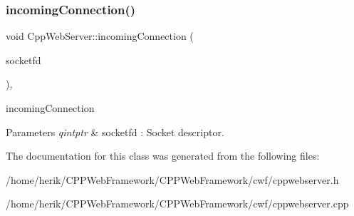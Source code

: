 \subsubsection{\texorpdfstring{incoming\+Connection()}{incomingConnection()}}
{\footnotesize\ttfamily void Cpp\+Web\+Server\+::incoming\+Connection (\begin{DoxyParamCaption}\item[{qintptr}]{socketfd }\end{DoxyParamCaption})\hspace{0.3cm}{\ttfamily [override]}, {\ttfamily [protected]}}



incoming\+Connection 


\begin{DoxyParams}{Parameters}
{\em qintptr} & socketfd \+: Socket descriptor. \\
\hline
\end{DoxyParams}


The documentation for this class was generated from the following files\+:\begin{DoxyCompactItemize}
\item 
/home/herik/\+C\+P\+P\+Web\+Framework/\+C\+P\+P\+Web\+Framework/cwf/cppwebserver.\+h\item 
/home/herik/\+C\+P\+P\+Web\+Framework/\+C\+P\+P\+Web\+Framework/cwf/cppwebserver.\+cpp\end{DoxyCompactItemize}
